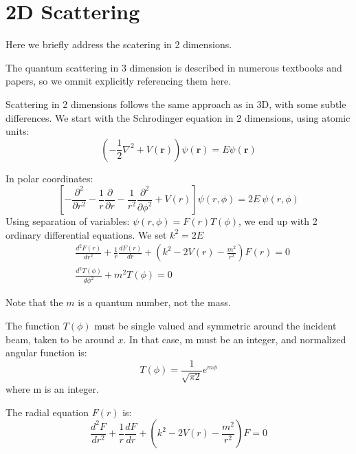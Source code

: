 \chapter{2D Scattering}

Here we briefly address the scatering in 2 dimensions.

The quantum scattering in 3 dimension is described in numerous textbooks and papers, so we ommit explicitly referencing them here.

Scattering in 2 dimensions follows the same approach as in 3D, with some subtle differences.
We start with the Schrodinger equation in 2 dimensions, using atomic units:
\begin{equation}\label{2DS1}
    \left(-\frac{1}{2}\nabla^2 + V(\mathbf{r})\right)\psi(\mathbf{r}) = E\psi(\mathbf{r})
\end{equation}

In polar coordinates:
\begin{equation}
    \left[-\frac{\partial^2}{\partial r^2} - \frac{1}{r}\frac{\partial}{\partial r} - \frac{1}{r^2}\frac{\partial^2}{\partial\phi^2} + V(r)\right]\psi(r,\phi) = 2E\ \psi(r,\phi)
\end{equation}
Using separation of variables: $ \psi(r,\phi) = F(r)T(\phi) $, we end up with 2 ordinary differential equations. We set $ k^2 = 2E $
\begin{equation}
\begin{split}
 & \frac{d^2F(r)}{d r^2} +\frac{1}{r}\frac{d F(r)}{d r} +(k^2 -  2V(r) - \frac{m^2}{r^2})F(r) = 0\\[.8em]
 & \frac{d^2 T(\phi)}{d \phi^2} + m^2 T(\phi) = 0
\end{split}
\end{equation}

Note that the $ m $ is a quantum number, not the mass. 

The function $ T(\phi) $ must be single valued and symmetric around the incident beam, taken to be around $ x $. In that case, m must be an integer, and normalized angular function is:
\begin{equation}
T(\phi) = \frac{1}{\sqrt{\pi 2}}e^{m\phi}
\end{equation}
where m is an integer.

The radial equation $ F(r) $ is:
\begin{equation}\label{frr}
\frac{d^2 F}{dr^2} + \frac{1}{r}\frac{dF}{dr} + \left(k^2 - 2V(r) - \frac{m^2}{r^2}\right)F = 0
\end{equation}

